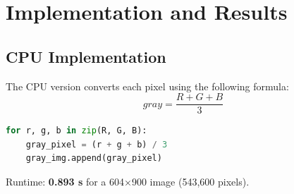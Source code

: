 \documentclass[hidelinks,12pt,a4paper]{article}
\begin{document}
\section{Implementation and Results}

\subsection{CPU Implementation}
The CPU version converts each pixel using the following formula:
\[
gray = \frac{R + G + B}{3}
\]

\begin{tcolorbox}[colback=gray!5!white, colframe=blue!40!black, title=CPU Python Code]
\begin{lstlisting}[language=Python]
for r, g, b in zip(R, G, B):
    gray_pixel = (r + g + b) / 3
    gray_img.append(gray_pixel)
\end{lstlisting}
\end{tcolorbox}

Runtime: \textbf{0.893 s} for a 604×900 image (543,600 pixels).  
\end{document}
